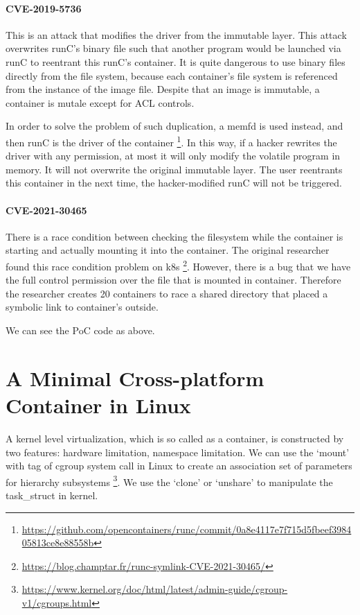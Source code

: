 \paragraph{CVE-2019-5736}
This is an attack that modifies the driver from the immutable layer. This attack
overwrites runC's binary file such that another program would be launched via runC to
reentrant this runC's container. It is quite dangerous to use binary files directly
from the file system, because each container's file system is referenced from the instance
of the image file. Despite that an image is immutable, a container is mutale except for ACL controls.

In order to solve the problem of such duplication, a memfd is used instead, and
then runC is the driver of the container \footnote{\url{https://github.com/opencontainers/runc/commit/0a8e4117e7f715d5fbeef398405813ce8e88558b}}.
In this way, if a hacker rewrites the driver with any permission, at most it will only modify
the volatile program in memory. It will not overwrite the original immutable layer.
The user reentrants this container in the next time, the hacker-modified runC will
not be triggered.


\paragraph{CVE-2021-30465}
There is a race condition between checking the filesystem while the container is
starting and actually mounting it into the container. The original researcher found
this race condition problem on k8s \footnote{\url{https://blog.champtar.fr/runc-symlink-CVE-2021-30465/}}.
However, there is a bug that we have the full control permission over the file that
is mounted in container. Therefore the researcher creates 20 containers to race a shared
directory that placed a symbolic link to container's outside.



We can see the PoC code as above.

\section{A Minimal Cross-platform Container in Linux}
A kernel level virtualization, which is so called as a container, is constructed by two
features: hardware limitation, namespace limitation. We can use the `mount' with tag of
cgroup system call in Linux to create an association set of parameters for hierarchy
subsystems \footnote{\url{https://www.kernel.org/doc/html/latest/admin-guide/cgroup-v1/cgroups.html}}.
We use the `clone' or `unshare' to manipulate the task\_struct in kernel.

